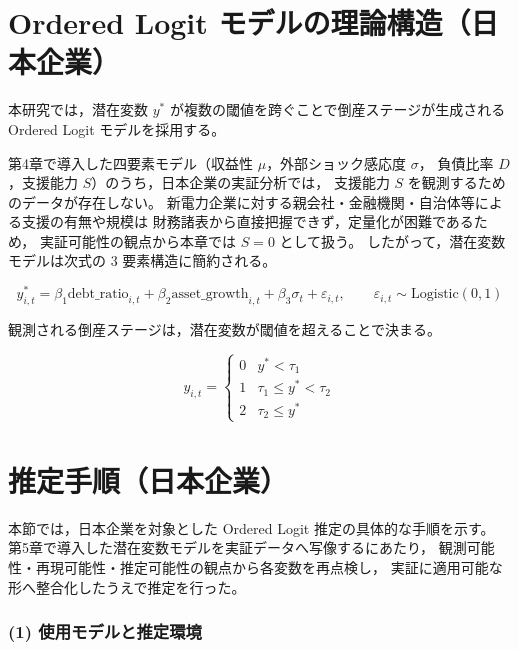 
\section{Ordered Logit モデルの理論構造（日本企業）}

本研究では，潜在変数 $y^*$ が複数の閾値を跨ぐことで倒産ステージが生成される
Ordered Logit モデルを採用する。

第4章で導入した四要素モデル（収益性 $\mu$，外部ショック感応度 $\sigma$，
負債比率 $D$，支援能力 $S$）のうち，日本企業の実証分析では，
支援能力 $S$ を観測するためのデータが存在しない。
新電力企業に対する親会社・金融機関・自治体等による支援の有無や規模は
財務諸表から直接把握できず，定量化が困難であるため，
実証可能性の観点から本章では $S=0$ として扱う。
したがって，潜在変数モデルは次式の 3 要素構造に簡約される。



\[
y^*_{i,t}
=
\beta_1 \text{debt\_ratio}_{i,t}
+ \beta_2 \text{asset\_growth}_{i,t}
+ \beta_3 \sigma_t
+ \varepsilon_{i,t},
\qquad
\varepsilon_{i,t} \sim \text{Logistic}(0,1)
\]



観測される倒産ステージは，潜在変数が閾値を超えることで決まる。



\[
y_{i,t} =
\begin{cases}
0 & y^* < \tau_1 \\
1 & \tau_1 \le y^* < \tau_2 \\
2 & \tau_2 \le y^*
\end{cases}
\]



\section{推定手順（日本企業）}

本節では，日本企業を対象とした Ordered Logit 推定の具体的な手順を示す。
第5章で導入した潜在変数モデルを実証データへ写像するにあたり，
観測可能性・再現可能性・推定可能性の観点から各変数を再点検し，
実証に適用可能な形へ整合化したうえで推定を行った。

\subsubsection{(1) 使用モデルと推定環境}

